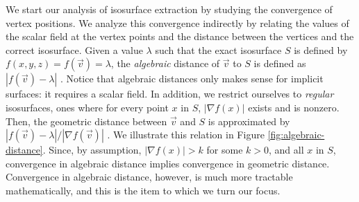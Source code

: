 We start our analysis of isosurface extraction by studying the
convergence of vertex positions. We analyze this convergence
indirectly by relating the values of the scalar field at the vertex
points and the distance between the vertices and the correct
isosurface. Given a value $\lambda$ such that the exact isosurface $S$
is defined by $f(x,y,z) = f(\vec{v}) = \lambda$, the \emph{algebraic}
distance of $\vec{v}$ to $S$ is defined as $|f(\vec{v}) - \lambda|$
\cite{Taubin94}. Notice that algebraic distances only makes sense
for implicit surfaces: it requires a scalar field. In addition, 
we restrict ourselves to \emph{regular} isosurfaces,
ones where for every point $x$ in $S$, $|\nabla f(x)|$ exists and
is nonzero.
%
Then, the geometric distance between
$\vec{v}$ and $S$ is approximated by $|f(\vec{v}) - \lambda| / |\nabla
f(\vec{v})|$ \cite{Taubin94}. We illustrate this relation
in Figure \ref{fig:algebraic-distance}. Since, by assumption, 
$|\nabla f(x)| > k$ for some
$k > 0$, and all $x$ in $S$, convergence in algebraic distance implies convergence in
geometric distance. Convergence in algebraic distance, however, is much
more tractable mathematically, and this is the item to which we turn our focus.

